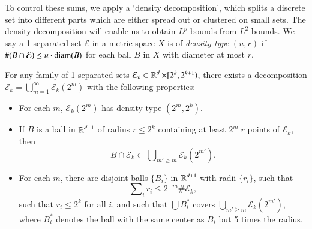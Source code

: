 To control these sums, we apply a `density decomposition', which splits a discrete set into different parts which are either spread out or clustered on small sets. The density decomposition will enable us to obtain $L^p$ bounds from $L^2$ bounds. We say a 1-separated set $\mathcal{E}$ in a metric space $X$ is of \emph{density type} $(u,r)$ if $\#(B \cap \mathcal{E}) \leq u \cdot \operatorname{\text{diam}}(B)$ for each ball $B$ in $X$ with diameter at most $r$.

%
%

\begin{lemma} \label{DecompositionTheorem}
    For any family of 1-separated sets $\mathcal{E}_k \subset \operatorname{\mathbb{R}}^d \times [2^k,2^{k+1})$, there exists a decomposition $\mathcal{E}_k = \bigcup_{m = 1}^\infty \mathcal{E}_k(2^m)$ with the following properties:
    \begin{itemize}[leftmargin=30pt]
        \item For each $m$, $\mathcal{E}_k(2^m)$ has density type $(2^m,2^k)$.

        \item If $B$ is a ball in $\operatorname{\mathbb{R}}^{d+1}$ of radius $r \leq 2^k$ containing at least $2^m\;\! r$ points of $\mathcal{E}_k$, then
        \[ B \cap \mathcal{E}_k \subset \bigcup\nolimits_{m' \geq m} \mathcal{E}_k(2^{m'}). \]

        \item For each $m$, there are disjoint balls $\{ B_i \}$ in $\operatorname{\mathbb{R}}^{d+1}$ with radii $\{ r_i \}$, such that
        \[ \sum\nolimits_i r_i \leq 2^{-m} \# \mathcal{E}_k, \]
        such that $r_i \leq 2^k$ for all $i$, and such that $\bigcup B_i^*$ covers $\bigcup_{m' \geq m} \mathcal{E}_k(2^{m'})$, where $B_i^*$ denotes the ball with the same center as $B_i$ but 5 times the radius.
    \end{itemize}
\end{lemma}
